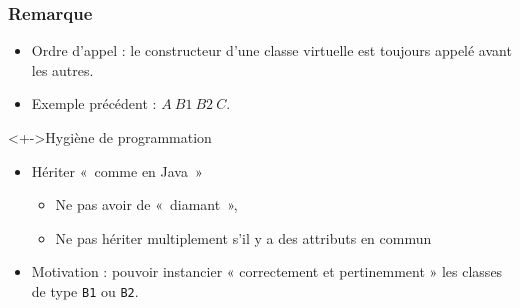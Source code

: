 \begin{frame}
\frametitle{Remarque}
\begin{itemize}[<+->]
	\item Ordre d'appel : le constructeur d'une classe virtuelle est toujours appelé avant les autres.
	\item Exemple précédent : $A~B1~B2~C$.
\end{itemize}
\begin{block}<+->{Hygiène de programmation}
\begin{itemize}[<+->]
\item Hériter «~comme en Java~»
	\begin{itemize}
	\item Ne pas avoir de «~diamant~»,
	\item Ne pas hériter multiplement s'il y a des attributs en commun
	\end{itemize}
\end{itemize}
\end{block}
\begin{itemize}[<+->]
\item Motivation : pouvoir instancier « correctement et pertinemment » les classes de type \texttt{B1} ou \texttt{B2}.
\end{itemize}
\end{frame}


